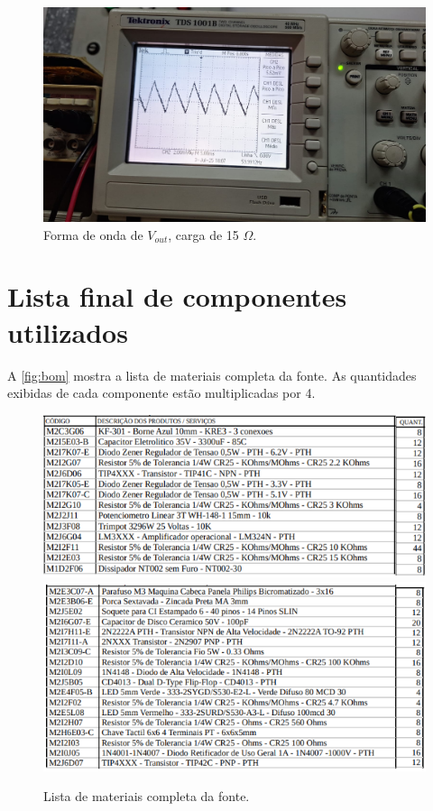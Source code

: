 \documentclass[
	12pt,				%
	oneside,			%
	a4paper,			%
	chapter=TITLE,
	sumario=tradicional,
	english,			%
	brazil				%
]{abntex2}
\begin{document}
\begin{figure}[H]
    \centering
    \includegraphics[width=0.9\linewidth]{images/resultados/vrip-saida-15.jpeg}
    \caption{Forma de onda de $V_{out}$, carga de 15 $\Omega$.}
    \label{fig:vrip-saida-15}
\end{figure}

\chapter{Lista final de componentes utilizados}\label{cap:lista_componentes} 

A \autoref{fig:bom} mostra a lista de materiais completa da fonte.
As quantidades exibidas de cada componente estão multiplicadas por 4.

\begin{figure}[H]
    \centering
    \includegraphics[width=0.9\linewidth]{images/resultados/bom-1.png}
    \includegraphics[width=0.9\linewidth]{images/resultados/bom-2.png}
    \caption{Lista de materiais completa da fonte.}
    \label{fig:bom}
\end{figure}
\end{document}
